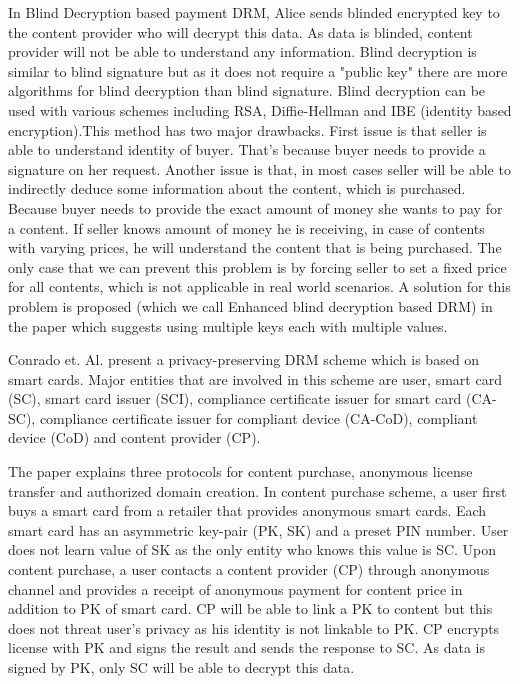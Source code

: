 \documentclass[times]{secauth}
\begin{document}
In Blind Decryption based payment DRM, Alice sends blinded encrypted key to the content provider who will decrypt this data. As data is blinded, content provider will not be able to understand any information. Blind decryption is similar to blind signature but as it does not require a "public key" there are more algorithms for blind decryption than blind signature. Blind decryption can be used with various schemes including RSA, Diffie-Hellman and IBE (identity based encryption).This method has two major drawbacks. First issue is that seller is able to understand identity of buyer. That's because buyer needs to provide a signature on her request. Another issue is that, in most cases seller will be able to indirectly deduce some information about the content, which is purchased. Because buyer needs to provide the exact amount of money she wants to pay for a content. If seller knows amount of money he is receiving, in case of contents with varying prices, he will understand the content that is being purchased. The only case that we can prevent this problem is by forcing seller to set a fixed price for all contents, which is not applicable in real world scenarios. A solution for this problem is proposed (which we call Enhanced blind decryption based DRM) in the paper  which suggests using multiple keys each with multiple values. 

Conrado et. Al. \cite{N30} present a privacy-preserving DRM scheme which is based on smart cards. Major entities that are involved in this scheme are user, smart card (SC), smart card issuer (SCI), compliance certificate issuer for smart card (CA-SC), compliance certificate issuer for compliant device (CA-CoD), compliant device (CoD) and content provider (CP).

The paper explains three protocols for content purchase, anonymous license transfer and authorized domain creation.
In content purchase scheme, a user first buys a smart card from a retailer that provides anonymous smart cards. Each smart card has an asymmetric key-pair (PK, SK) and a preset PIN number. User does not learn value of SK as the only entity who knows this value is SC. Upon content purchase, a user contacts a content provider (CP) through anonymous channel and provides a receipt of anonymous payment for content price in addition to PK of smart card. CP will be able to link a PK to content but this does not threat user's privacy as his identity is not linkable to PK. CP encrypts license with PK and signs the result and sends the response to SC. As data is signed by PK, only SC will be able to decrypt this data.
\end{document}
